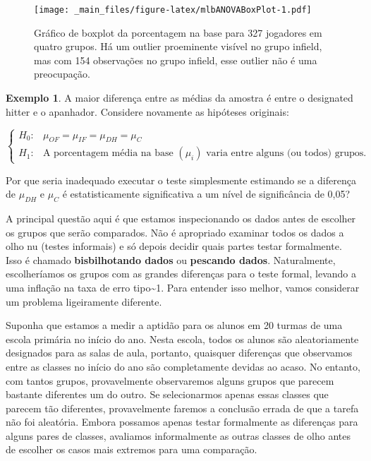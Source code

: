 \documentclass[
]{book}
\theoremstyle{definition}
\theoremstyle{definition}
\newtheorem{example}{Exemplo}[chapter]
\theoremstyle{definition}
\theoremstyle{definition}
\theoremstyle{remark}
\begin{document}
\begin{figure}
\centering
\texttt{[image: \_main\_files/figure-latex/mlbANOVABoxPlot-1.pdf]}
\caption{\label{fig:mlbANOVABoxPlot}Gráfico de boxplot da porcentagem na base para 327 jogadores em quatro grupos. Há um outlier proeminente visível no grupo infield, mas com 154 observações no grupo infield, esse outlier não é uma preocupação.}
\end{figure}

\begin{example}
\protect\hypertarget{exm:multipleComparisonExampleThatIncludesDiscussionOfClassrooms}{}{\label{exm:multipleComparisonExampleThatIncludesDiscussionOfClassrooms} } A maior diferença entre as médias da amostra é entre o designated hitter e o apanhador. Considere novamente as hipóteses originais:
\end{example}

\[
\begin{cases}
  H_0: & \mu_{OF} = \mu_{IF} = \mu_{DH} = \mu_{C} \\ 
  H_1: & \mbox{A porcentagem média na base } (\mu_i) \mbox{ varia entre alguns (ou todos) grupos.}
\end{cases}
\]

Por que seria inadequado executar o teste simplesmente estimando se a diferença de \(\mu_{DH}\) e \(\mu_{C}\) é estatisticamente significativa a um nível de significância de 0,05?

A principal questão aqui é que estamos inspecionando os dados antes de escolher os grupos que serão comparados. Não é apropriado examinar todos os dados a olho nu (testes informais) e só depois decidir quais partes testar formalmente. Isso é chamado \textbf{bisbilhotando dados} ou \textbf{pescando dados}. Naturalmente, escolheríamos os grupos com as grandes diferenças para o teste formal, levando a uma inflação na taxa de erro tipo\textasciitilde1. Para entender isso melhor, vamos considerar um problema ligeiramente diferente.

Suponha que estamos a medir a aptidão para os alunos em 20 turmas de uma escola primária no início do ano. Nesta escola, todos os alunos são aleatoriamente designados para as salas de aula, portanto, quaisquer diferenças que observamos entre as classes no início do ano são completamente devidas ao acaso. No entanto, com tantos grupos, provavelmente observaremos alguns grupos que parecem bastante diferentes um do outro. Se selecionarmos apenas essas classes que parecem tão diferentes, provavelmente faremos a conclusão errada de que a tarefa não foi aleatória. Embora possamos apenas testar formalmente as diferenças para alguns pares de classes, avaliamos informalmente as outras classes de olho antes de escolher os casos mais extremos para uma comparação.
\end{document}
